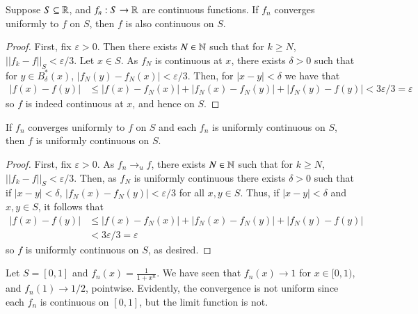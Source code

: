 \begin{theorem}
    Suppose $S \subseteq \mathbb R$, and $f_n:S\rightarrow \mathbb R$ are continuous functions. If $f_n$ converges uniformly to $f$ on $S$, then $f$ is also continuous on $S$.
\end{theorem}
\begin{proof}
    First, fix $\varepsilon > 0$. Then there exists $N \in \mathbb N$ such that for $k \geq N$, $||f_k - f||_S < \varepsilon/3$. Let $x \in S$. As $f_N$ is continuous at $x$, there exists $\delta > 0$ such that for $y \in B_{\delta}^*(x)$, $|f_N(y) -f_N(x)| < \varepsilon/3$. Then, for $|x-y| < \delta$ we have that \begin{align*}
        |f(x) - f(y)| &\leq |f(x) - f_N(x)| + |f_N(x) - f_N(y)| + |f_N(y) - f(y)| < 3\varepsilon/3 = \varepsilon
    \end{align*}
    so $f$ is indeed continuous at $x$, and hence on $S$.
\end{proof}


\begin{proposition}
    If $f_n$ converges uniformly to $f$ on $S$ and each $f_n$ is uniformly continuous on $S$, then $f$ is uniformly continuous on $S$.
\end{proposition}
\begin{proof}
    First, fix $\varepsilon > 0$. As $f_n\rightarrow_uf$, there exists $N \in \mathbb N$ such that for $k \geq N$, $||f_k - f||_S < \varepsilon/3$. Then, as $f_N$ is uniformly continuous there exists $\delta > 0$ such that if $|x-y| < \delta$, $|f_N(x) - f_N(y)| < \varepsilon/3$ for all $x,y \in S$. Thus, if $|x-y| < \delta$ and $x,y \in S$, it follows that \begin{align*}
        |f(x) - f(y)| &\leq |f(x) - f_N(x)| + |f_N(x) - f_N(y)| + |f_N(y) - f(y)| \\
        &< 3\varepsilon/3 = \varepsilon
    \end{align*}
    so $f$ is uniformly continuous on $S$, as desired.
\end{proof}

\begin{example}
    Let $S = [0,1]$ and $f_n(x) = \frac{1}{1+x^n}$. We have seen that $f_n(x) \rightarrow 1$ for $x \in [0,1)$, and $f_n(1)\rightarrow 1/2$, pointwise. Evidently, the convergence is not uniform since each $f_n$ is continuous on $[0,1]$, but the limit function is not.
\end{example}

